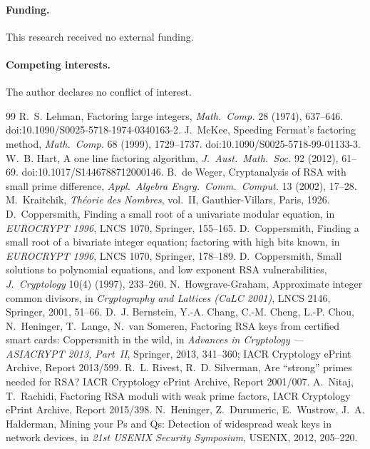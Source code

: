 \documentclass[11pt,a4paper]{article}
\begin{document}
\paragraph{Funding.} This research received no external funding.
\paragraph{Competing interests.} The author declares no conflict of interest.

\begin{thebibliography}{99}\small
{} R.~S. Lehman, Factoring large integers, \emph{Math.\ Comp.} 28 (1974), 637--646. doi:10.1090/S0025-5718-1974-0340163-2.
 J.~McKee, Speeding Fermat's factoring method, \emph{Math.\ Comp.} 68 (1999), 1729--1737. doi:10.1090/S0025-5718-99-01133-3.
 W.~B. Hart, A one line factoring algorithm, \emph{J.\ Aust.\ Math.\ Soc.} 92 (2012), 61--69. doi:10.1017/S1446788712000146.
 B.~de Weger, Cryptanalysis of RSA with small prime difference, \emph{Appl.\ Algebra Engrg.\ Comm.\ Comput.} 13 (2002), 17--28.
 M.~Kraitchik, \emph{Th\'eorie des Nombres}, vol.~II, Gauthier-Villars, Paris, 1926.
 D.~Coppersmith, Finding a small root of a univariate modular equation, in \emph{EUROCRYPT 1996}, LNCS 1070, Springer, 155--165.
 D.~Coppersmith, Finding a small root of a bivariate integer equation; factoring with high bits known, in \emph{EUROCRYPT 1996}, LNCS 1070, Springer, 178--189.
 D.~Coppersmith, Small solutions to polynomial equations, and low exponent RSA vulnerabilities, \emph{J.\ Cryptology} 10(4) (1997), 233--260.
 N.~Howgrave-Graham, Approximate integer common divisors, in \emph{Cryptography and Lattices (CaLC 2001)}, LNCS 2146, Springer, 2001, 51--66.
 D.~J. Bernstein, Y.-A. Chang, C.-M. Cheng, L.-P. Chou, N.~Heninger, T.~Lange, N.~van Someren, Factoring RSA keys from certified smart cards: Coppersmith in the wild, in \emph{Advances in Cryptology --- ASIACRYPT 2013, Part~II}, Springer, 2013, 341--360; IACR Cryptology ePrint Archive, Report 2013/599.
 R.~L. Rivest, R.~D. Silverman, Are ``strong'' primes needed for RSA? IACR Cryptology ePrint Archive, Report 2001/007.
 A.~Nitaj, T.~Rachidi, Factoring RSA moduli with weak prime factors, IACR Cryptology ePrint Archive, Report 2015/398.
 N.~Heninger, Z.~Durumeric, E.~Wustrow, J.~A. Halderman, Mining your Ps and Qs: Detection of widespread weak keys in network devices, in \emph{21st USENIX Security Symposium}, USENIX, 2012, 205--220.

\end{thebibliography}
\end{document}
